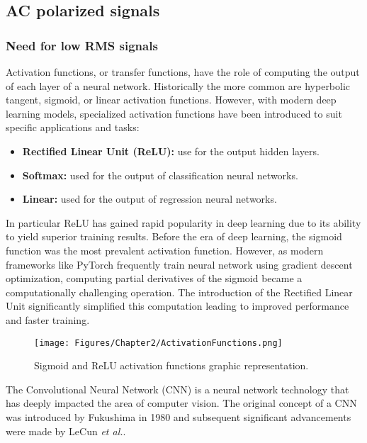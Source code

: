 \subsection{AC polarized signals}

\subsubsection{Need for low RMS signals}
Activation functions, or transfer functions, have the role of computing the output of each layer of a neural network. Historically the more common are hyperbolic tangent, sigmoid, or linear activation functions. However, with modern deep learning models, specialized activation functions have been introduced to suit specific applications and tasks:
\begin{itemize}
    \item\textbf{Rectified Linear Unit (ReLU):} use for the output hidden layers.
    \item\textbf{Softmax:} used for the output of classification neural networks.
    \item\textbf{Linear:} used for the output of regression neural networks.
\end{itemize}
In particular ReLU has gained rapid popularity in deep learning due to its ability to yield superior training results. Before the era of deep learning, the sigmoid function was the most prevalent activation function. However, as modern frameworks like PyTorch frequently train neural network using gradient descent optimization, computing partial derivatives of the sigmoid became a computationally challenging operation. The introduction of the Rectified Linear Unit significantly simplified this computation leading to improved performance and faster training.

\begin{figure}[th]
    \centering
    \texttt{[image: Figures/Chapter2/ActivationFunctions.png]}
    \caption[Sigmoid vs. ReLU]{Sigmoid and ReLU activation functions graphic representation.}
    \label{fig:ActivationFunctions}
\end{figure}


The Convolutional Neural Network (CNN) is a neural network technology that has deeply impacted the area of computer vision. The original concept of a CNN was introduced by Fukushima in 1980\parencite{fukushima} and subsequent significant advancements were made by LeCun \emph{et al.}\parencite{Lecun}.

